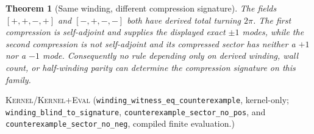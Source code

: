 \documentclass[11pt]{article}
\newcommand{\Kernel}{\textcolor{kernelcolor}{\textsc{Kernel}}}
\newcommand{\DraftTrust}{\textcolor{draftcolor}{\textsc{Kernel+Eval}}}
\newtheorem{theorem}{Theorem}
\begin{document}
\begin{theorem}[Same winding, different compression signature]
The fields $[+,+,-,+]$ and $[-,+,-,-]$ both have derived total turning
$2\pi$.  The first compression is self-adjoint and supplies the displayed
exact $\pm1$ modes, while the second compression is not self-adjoint and its
compressed sector has neither a $+1$ nor a $-1$ mode.  Consequently no rule
depending only on derived winding, wall count, or half-winding parity can
determine the compression signature on this family.
\end{theorem}
\noindent\Kernel{}/\DraftTrust{}\quad
(\texttt{winding\_witness\_eq\_counterexample}, kernel-only;
\texttt{winding\_blind\_to\_signature},
\texttt{counterexample\_sector\_no\_pos}, and
\texttt{counterexample\_sector\_no\_neg}, compiled finite evaluation.)
\end{document}
